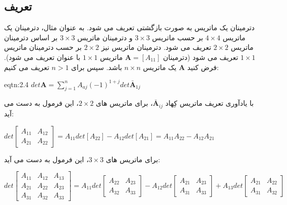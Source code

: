 \subsection{\textbf{تعریف}}
{
    \Large
    \begin{spacing}{1.3}
        دترمینان یک ماتریس به صورت بازگشتی تعریف می شود.
        به عنوان مثال، دترمینان یک ماتریس $4\times 4$ بر حسب ماتریس $3\times 3$ و دترمینان ماتریس $3\times 3$ بر اساس دترمینان ماتریس $2\times 2$ تعریف می شود.
        دترمینان ماتریس نیز $2\times 2$ بر حسب دترمینان ماتریس $1\times 1$ تعریف می شود
        (دترمینان $\textbf{A}=[A_{11}]$ ماتریس $1\times 1$ با عنوان  تعریف می شود).
        فرض کنید $\textbf{A}$ یک ماتریس $n\times n$ باشد. سپس برای $n>1$ تعریف می کنیم:

        \begin{eqtn}{eqtn:2.4}
            \centering
            $det\textbf{A}=\sum\limits_{j=1}^{n}A_{aj}(-1)^{1+j}det\bar{\textbf{A}}_{1j}$
        \end{eqtn}

        با یادآوری تعریف ماتریس کِهاد $\bar{\textbf{A}}_{ij}$، برای ماتریس های $2\times 2$، این فرمول به دست می آید:

        \begin{center}
            $det\begin{bmatrix}
                    A_{11} & A_{12} \\
                    A_{21} & A_{22}
            \end{bmatrix}=A_{11}det[A_{22}]-A_{12}det[A_{21}]=A_{11}A_{22}-A_{12}A_{21}$
        \end{center}

        برای ماتریس های $3\times 3$، این فرمول به دست می آید:

        \begin{flushleft}
            $det\begin{bmatrix}
                    A_{11} & A_{12} & A_{13} \\
                    A_{21} & A_{22} & A_{23} \\
                    A_{31} & A_{32} & A_{33}
            \end{bmatrix}=A_{11}det\begin{bmatrix}
                                       A_{22} & A_{23} \\
                                       A_{32} & A_{33}
            \end{bmatrix}-A_{12}det\begin{bmatrix}
                                       A_{21} & A_{23} \\
                                       A_{31} & A_{33}
            \end{bmatrix}+A_{13}det\begin{bmatrix}
                                       A_{21} & A_{22} \\
                                       A_{31} & A_{32}
            \end{bmatrix}$
        \end{flushleft}


\end{spacing}}
